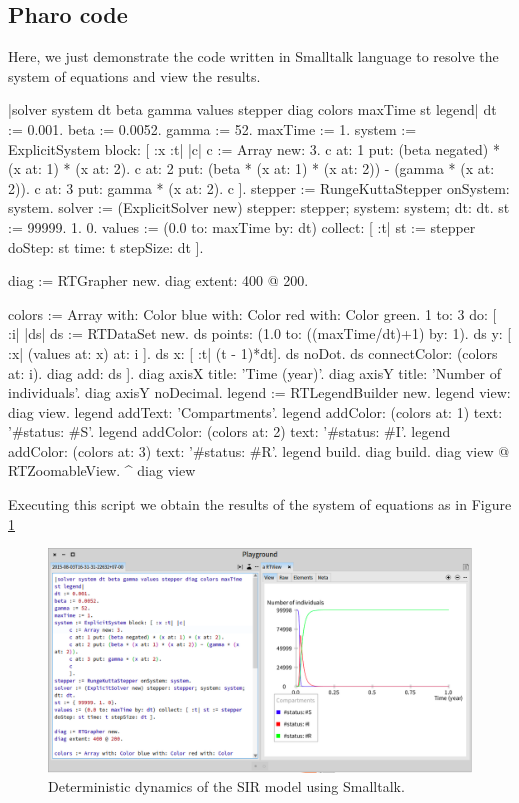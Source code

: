 \documentclass[a4paper,10pt,twoside]{book}
\begin{document}
\subsection{ Pharo code}
Here, we just demonstrate the code written in Smalltalk language to resolve the system of equations and view the results.

\begin{code}{}
|solver system dt beta gamma values stepper diag colors maxTime st legend|
dt := 0.001.
beta := 0.0052.
gamma := 52.
maxTime := 1.
system := ExplicitSystem block: [ :x :t| |c|
     c := Array new: 3.
     c at: 1 put: (beta negated) * (x at: 1) * (x at: 2).
     c at: 2 put: (beta * (x at: 1) * (x at: 2)) - (gamma * (x at: 2)).
     c at: 3 put: gamma * (x at: 2).
     c
     ].
stepper := RungeKuttaStepper onSystem: system.
solver := (ExplicitSolver new) stepper: stepper; system: system; dt: dt.
st := { 99999. 1. 0}.
values := (0.0 to: maxTime by: dt) collect: [ :t| st := stepper doStep: st time: t stepSize: dt ].

diag := RTGrapher new.
diag extent: 400 @ 200.

colors := Array with: Color blue with: Color red with: Color green.
1 to: 3 do: [ :i|
	|ds|
	ds := RTDataSet new.
	ds points: (1.0 to: ((maxTime/dt)+1) by: 1).
	ds y: [ :x| (values at: x) at: i ].
	ds x: [ :t| (t - 1)*dt].
	ds noDot.
	ds connectColor: (colors at: i).
	diag add: ds ].
diag axisX title: 'Time (year)'.
diag axisY title: 'Number of individuals'.
diag axisY noDecimal.
legend := RTLegendBuilder new.
legend view: diag view.
legend addText: 'Compartments'.
legend addColor: (colors at: 1) text: '#status: #S'.
legend addColor: (colors at: 2) text: '#status: #I'.
legend addColor: (colors at: 3) text: '#status: #R'.
legend build.
diag build.
diag view @ RTZoomableView.
^ diag view
\end{code}

Executing this script we obtain the results of the system of equations as in Figure \ref{SIR_RK4_pharo}

\begin{figure}

\begin{center}
\includegraphics[width=1.0\textwidth]{figures/SIR_RK4_pharo.png}\caption{Deterministic dynamics of the SIR model using Smalltalk.\label{SIR_RK4_pharo}}\end{center}
\end{figure}
\end{document}
